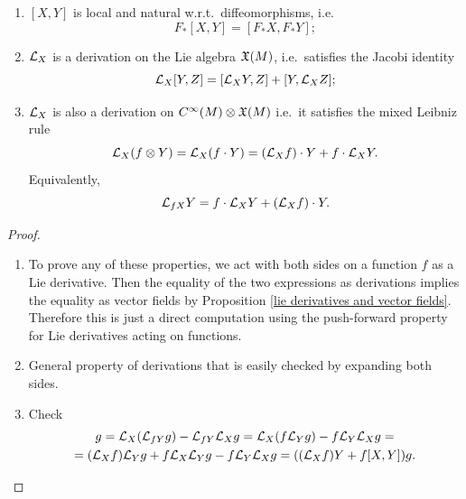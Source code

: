 \begin{prop}\label{prop properties of Lie derivatives}
\begin{enumerate}
    \item $[X,Y]$ is local and natural w.r.t.\ diffeomorphisms, i.e.\ \[F_\ast [X,Y]=[F_\ast X,F_\ast Y];\]
    \item $\mathcal{L}_X$ is a derivation on the Lie algebra $\mathfrak{X}(M)$, i.e.\ satisfies the Jacobi identity
    \[\mathcal{L}_X [Y,Z]=[\mathcal{L}_X Y,Z]+[Y,\mathcal{L}_X Z];\]
    \item $\mathcal{L}_X$ is also a derivation on $C^\infty(M)\otimes \mathfrak{X}(M)$ i.e.\ it satisfies the mixed Leibniz rule
    \[\mathcal{L}_X(f\otimes Y)=\mathcal{L}_X(f\cdot Y)=(\mathcal{L}_X f)\cdot Y+f\cdot \mathcal{L}_X Y.\]
    Equivalently, 
    \[\mathcal{L}_{fX}Y=f\cdot \mathcal{L}_X Y+\left(\mathcal{L}_X f\right)\cdot Y.\label{Lie derivative not covariant}\]
\end{enumerate}
\end{prop}
\begin{proof}
    \begin{enumerate}
        \item To prove any of these properties, we act with both sides on a function $f$ as a Lie derivative. Then the equality of the two expressions as derivations implies the equality as vector fields by Proposition \ref{lie derivatives and vector fields}. Therefore this is just a direct computation using the push-forward property for Lie derivatives acting on functions.
        \item General property of derivations that is easily checked by expanding both sides.
        \item Check 
        \begin{multline}
            [X,fY]g=\Lie_X (\Lie_{fY}g)-\Lie_{fY}\Lie_X g=\Lie_X (f\Lie_Y g)-f\Lie_Y \Lie_X g=\\=(\Lie_X f)\Lie_Y g+f\Lie_X\Lie_Y g-f\Lie_Y\Lie_X g=((\Lie_X f)Y+f[X,Y])g.
        \end{multline}
    \end{enumerate}
\end{proof}


